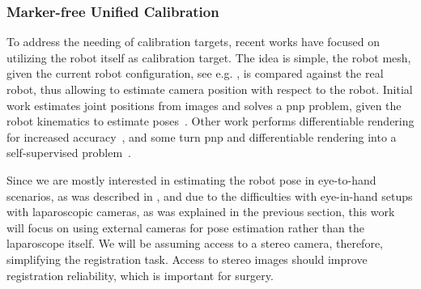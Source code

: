 \subsubsection{Marker-free Unified Calibration}
\label{in:sec:marker_free_unified_calibration}
To address the needing of calibration targets, recent works have focused on utilizing the robot itself as calibration target. The idea is simple, the robot mesh, given the current robot configuration, see e.g. , is compared against the real robot, thus allowing to estimate camera position with respect to the robot. Initial work estimates joint positions from images and solves a \gls{pnp} problem, given the robot kinematics to estimate poses~\cite{labbe2021single}. Other work performs differentiable rendering for increased accuracy~\cite{Chen:RAL:2023}, and some turn \gls{pnp} and differentiable rendering into a self-supervised problem~\cite{lu2023markerless}.

Since we are mostly interested in estimating the robot pose in eye-to-hand scenarios, as was described in , and due to the difficulties with eye-in-hand setups with laparoscopic cameras, as was explained in the previous section, this work will focus on using external cameras for pose estimation rather than the laparoscope itself. We will be assuming access to a stereo camera, therefore, simplifying the registration task. Access to stereo images should improve registration reliability, which is important for surgery. 




% 

